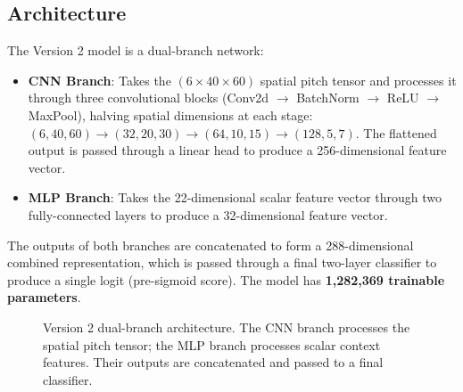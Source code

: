 \documentclass{article}
\begin{document}
\subsection{Architecture}

The Version 2 model is a dual-branch network:

\begin{itemize}
    \item \textbf{CNN Branch}: Takes the $(6 \times 40 \times 60)$ spatial pitch tensor and processes it through three convolutional blocks (Conv2d $\to$ BatchNorm $\to$ ReLU $\to$ MaxPool), halving spatial dimensions at each stage: $(6,40,60) \to (32,20,30) \to (64,10,15) \to (128,5,7)$. The flattened output is passed through a linear head to produce a 256-dimensional feature vector.
    \item \textbf{MLP Branch}: Takes the 22-dimensional scalar feature vector through two fully-connected layers to produce a 32-dimensional feature vector.
\end{itemize}

The outputs of both branches are concatenated to form a 288-dimensional combined representation, which is passed through a final two-layer classifier to produce a single logit (pre-sigmoid score). The model has \textbf{1,282,369 trainable parameters}.

\begin{figure}[h]
\centering
{}
\caption{Version 2 dual-branch architecture. The CNN branch processes the spatial pitch tensor; the MLP branch processes scalar context features. Their outputs are concatenated and passed to a final classifier.}
\label{fig:v2arch}
\end{figure}
\end{document}
